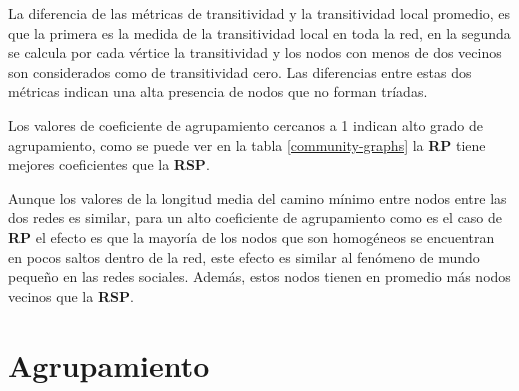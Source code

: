 \begin{table}[htb]
\centering
\caption{Métricas de efectos de comunidad en redes}
\label{community-graphs}
\end{table}

La diferencia de las métricas de transitividad y la transitividad local promedio, es que la primera es la medida de la transitividad local en toda la red, en la segunda se calcula por cada vértice la transitividad y los nodos con menos de dos vecinos son considerados como de transitividad cero\cite{Watts1998}. Las diferencias entre estas dos métricas indican una alta presencia de nodos que no forman tríadas.

Los valores de coeficiente de agrupamiento cercanos a 1 indican alto grado de agrupamiento, como se puede ver en la tabla \ref{community-graphs} la \textbf{RP} tiene mejores coeficientes que la \textbf{RSP}. 

Aunque los valores de la longitud media del camino mínimo entre nodos entre las dos redes es similar, para un alto coeficiente de agrupamiento como es el caso de \textbf{RP} el efecto es que la mayoría de los nodos que son homogéneos se encuentran en pocos saltos dentro de la red, este efecto es similar al fenómeno de mundo pequeño en las redes sociales\cite{Cook2006}. Además, estos nodos tienen en promedio más nodos vecinos que la \textbf{RSP}.

\section{Agrupamiento}

